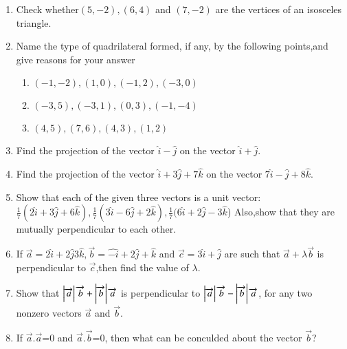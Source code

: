 \begin{enumerate}[label=\thesection.\arabic*,ref=\thesection.\theenumi]
\item Check whether$(5,-2),(6,4)$ and $(7,-2)$ are the vertices of an isosceles triangle.
\item Name the type of quadrilateral formed, if any, by the following points,and give reasons for your answer
\begin{enumerate}
\item $(-1,-2),(1,0),(-1,2),(-3,0)$
\item $(-3,5),(-3,1),(0,3),(-1,-4)$
\item $(4,5),(7,6),(4,3),(1,2)$
\end{enumerate}
\solution
		
\item Find the projection of the vector $\hat{i}-\hat{j}$ on the vector $\hat{i}+\hat{j}$.
	\\
		
\item Find the projection of the vector $\hat{i}+3\hat{j}+7\hat{k}$ on the vector $7\hat{i}-\hat{j}+8\hat{k}$.
	\\
	\solution
		
\item Show that each of the given three vectors is a unit vector: 
 $\frac{1}{7}(2\hat{i}+3\hat{j}+6\hat{k}),\frac{1}{7}(3\hat{i}-6\hat{j}+2\hat{k}),\frac{1}{7}(6\hat{i}+2\hat{j}-3\hat{k}$)
Also,show that they are mutually perpendicular to each other.
	\\
	\solution
		
\item If $\overrightarrow {a}=2\hat{i}+2\hat{j}3\hat{k},\overrightarrow {b}=\hat{-i}+2\hat{j}+\hat{k}$ and $\overrightarrow {c}=3\hat{i}+\hat{j}$ are such that $\overrightarrow {a}+\lambda\overrightarrow {b}$ is perpendicular to $\overrightarrow {c}$,then find the value of $\lambda$.
	\\
		
\item Show that $\left\vert\overrightarrow {a}\right\vert\overrightarrow {b}+\left\vert\overrightarrow {b}\right\vert\overrightarrow {a}$ is perpendicular to $\left\vert\overrightarrow {a}\right\vert \overrightarrow {b}-\left\vert\overrightarrow {b}\right\vert \overrightarrow {a}$, for any two nonzero vectors $\overrightarrow {a}$ and $\overrightarrow {b}$.
	\\
	\solution
		
\item If $\overrightarrow {a}.\overrightarrow {a}$=0 and $\overrightarrow {a}.\overrightarrow {b}$=0, then what can be conculded about the vector $\overrightarrow {b}$?

\end{enumerate}
